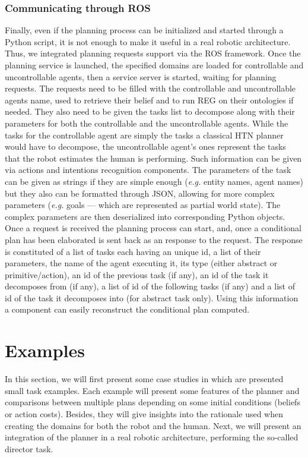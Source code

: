 \documentclass[a4paper,11pt,twoside]{StyleThese}
\begin{document}
\subsubsection{Communicating through ROS}
Finally, even if the planning process can be initialized and started through a Python script, it is not enough to make it useful in a real robotic architecture. Thus, we integrated planning requests support via the ROS framework. 
Once the planning service is launched, the specified domains are loaded for controllable and uncontrollable agents, then a service server is started, waiting for planning requests. 
The requests need to be filled with the controllable and uncontrollable agents name, used to retrieve their belief and to run REG on their ontologies if needed. 
They also need to be given the tasks list to decompose along with their parameters for both the controllable and the uncontrollable agents. While the tasks for the controllable agent are simply the tasks a classical HTN planner would have to decompose, the uncontrollable agent's ones represent the tasks that the robot estimates the human is performing. Such information can be given via actions and intentions recognition components. The parameters of the task can be given as strings if they are simple enough (\textit{e.g.} entity names, agent names) but they also can be formatted through JSON, allowing for more complex parameters (\textit{e.g.} goals --- which are represented as partial world state). The complex parameters are then deserialized into corresponding Python objects.
Once a request is received the planning process can start, and, once a conditional plan has been elaborated is sent back as an response to the request. The response is constituted of a list of tasks each having an unique id, a list of their parameters, the name of the agent executing it, its type (either abstract or primitive/action), an id of the previous task (if any), an id of the task it decomposes from (if any), a list of id of the following tasks (if any) and a list of id of the task it decomposes into (for abstract task only). Using this information a component can easily reconstruct the conditional plan computed.




\section{Examples}
In this section, we will first present some case studies in which are presented small task examples. Each example will present some features of the planner and comparisons between multiple plans depending on some initial conditions (beliefs or action costs). Besides, they will give insights into the rationale used when creating the domains for both the robot and the human.
Next, we will present an integration of the planner in a real robotic architecture, performing the so-called director task.
\end{document}

